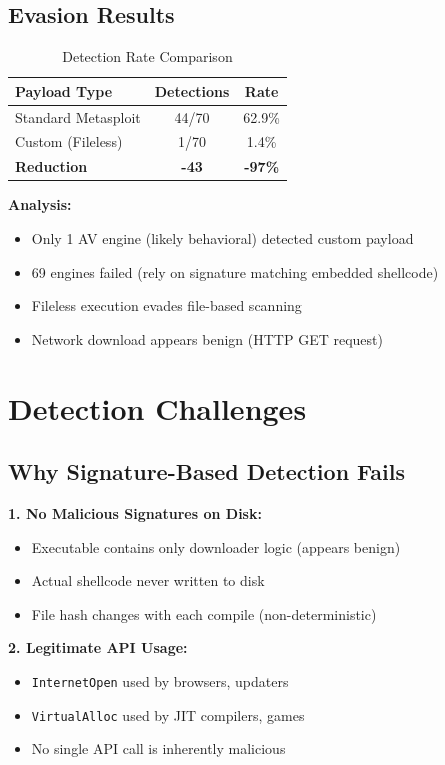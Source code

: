 \documentclass[11pt,conference]{IEEEtran}
\begin{document}
\subsection{Evasion Results}

\begin{table}[h]
\centering
\caption{Detection Rate Comparison}
\begin{tabular}{|l|c|c|}
\hline
\textbf{Payload Type} & \textbf{Detections} & \textbf{Rate} \\
\hline
Standard Metasploit & 44/70 & 62.9\% \\
\hline
Custom (Fileless) & 1/70 & 1.4\% \\
\hline
\textbf{Reduction} & \textbf{-43} & \textbf{-97\%} \\
\hline
\end{tabular}
\end{table}

\textbf{Analysis:}
\begin{itemize}
    \item Only 1 AV engine (likely behavioral) detected custom payload
    \item 69 engines failed (rely on signature matching embedded shellcode)
    \item Fileless execution evades file-based scanning
    \item Network download appears benign (HTTP GET request)
\end{itemize}

\section{Detection Challenges}

\subsection{Why Signature-Based Detection Fails}

\textbf{1. No Malicious Signatures on Disk:}
\begin{itemize}
    \item Executable contains only downloader logic (appears benign)
    \item Actual shellcode never written to disk
    \item File hash changes with each compile (non-deterministic)
\end{itemize}

\textbf{2. Legitimate API Usage:}
\begin{itemize}
    \item \texttt{InternetOpen} used by browsers, updaters
    \item \texttt{VirtualAlloc} used by JIT compilers, games
    \item No single API call is inherently malicious
\end{itemize}
\end{document}
